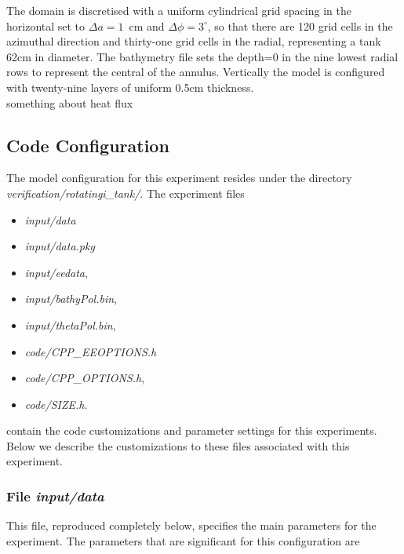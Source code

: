  The domain is discretised with a uniform cylindrical grid spacing in
the horizontal set to $\Delta a=1$~cm and $\Delta \phi=3^{\circ}$, so
that there are 120 grid cells in the azimuthal direction and
thirty-one grid cells in the radial, representing a tank 62cm in
diameter.  The bathymetry file sets the depth=0 in the nine lowest
radial rows to represent the central of the annulus.  Vertically the
model is configured with twenty-nine layers of uniform 0.5cm
thickness.
\\
something about heat flux

\subsection{Code Configuration}
\label{www:tutorials}
\label{SEC:eg-baro-code_config}

The model configuration for this experiment resides under the
directory {\it verification/rotatingi\_tank/}.  The experiment files
\begin{itemize}
\item {\it input/data}
\item {\it input/data.pkg}
\item {\it input/eedata},
\item {\it input/bathyPol.bin},
\item {\it input/thetaPol.bin},
\item {\it code/CPP\_EEOPTIONS.h}
\item {\it code/CPP\_OPTIONS.h},
\item {\it code/SIZE.h}.
\end{itemize}

contain the code customizations and parameter settings for this 
experiments. Below we describe the customizations
to these files associated with this experiment.

\subsubsection{File {\it input/data}}
\label{www:tutorials}

This file, reproduced completely below, specifies the main parameters 
for the experiment. The parameters that are significant for this configuration
are

